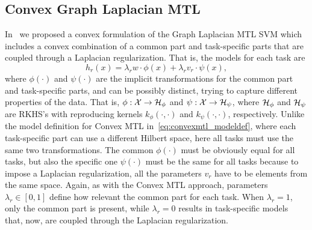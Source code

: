 \subsection{Convex Graph Laplacian MTL}



In~\cite{RuizAD21_hais} we proposed a convex formulation of the Graph Laplacian MTL SVM which includes a convex combination of a common part and task-specific parts that are coupled through a Laplacian regularization.
That is, the models for each task are
\begin{equation}
    \nonumber
    h_r(x) = \lambda_r w \cdot \phi(x) + \lambda_r v_r \cdot \psi(x) ,
\end{equation}
where $\phi(\cdot)$ and $\psi(\cdot)$ are the implicit transformations for the common part and task-specific parts, and can be possibly distinct, trying to capture different properties of the data.
That is, $\phi: \mathcal{X} \to \mathcal{H}_\phi$ and $\psi: \mathcal{X} \to \mathcal{H}_\psi$, where $\mathcal{H}_\phi$ and $\mathcal{H}_\psi$ are RKHS's with reproducing kernels $k_\phi(\cdot, \cdot)$ and $k_\psi(\cdot, \cdot)$, respectively.
Unlike the model definition for Convex MTL in~\eqref{eq:convexmtl_modeldef}, where each task-specific part can use a different Hilbert space, here all tasks must use the same two transformations. The common $\phi(\cdot)$ must be obviously equal for all tasks, but also the specific one $\psi(\cdot)$ must be the same for all tasks because to impose a Laplacian regularization, all the parameters $v_r$ have to be elements from the same space.
Again, as with the Convex MTL approach, parameters $\lambda_r \in [0, 1]$ define how relevant the common part for each task. When $\lambda_r=1$, only the common part is present, while $\lambda_r=0$ results in task-specific models that, now, are coupled through the Laplacian regularization.

